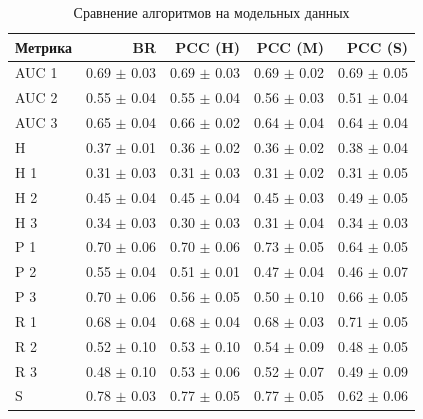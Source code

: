 \documentclass{ITaSconf}
\newcommand\headline{\hline}
\begin{document}
\begin{table}[p]%
	\caption{Сравнение алгоритмов на модельных данных}
	\label{t:modelData}
	\centering\medskip%
	\begin{tabular}{lrrrr}
		\headline
		Метрика &             BR &         PCC (H) &         PCC (M) &         PCC (S) \\
		\headline
		AUC 1 &   0.69 $\pm$ 0.03 &  0.69 $\pm$ 0.03 &  0.69 $\pm$ 0.02 &  0.69 $\pm$ 0.05 \\
		AUC 2 &   0.55 $\pm$ 0.04 &  0.55 $\pm$ 0.04 &  0.56 $\pm$ 0.03 &  0.51 $\pm$ 0.04 \\
		AUC 3 &   0.65 $\pm$ 0.04 &  0.66 $\pm$ 0.02 &  0.64 $\pm$ 0.04 &  0.64 $\pm$ 0.04 \\
		H     &  0.37 $\pm$ 0.01 &  0.36 $\pm$ 0.02 &  0.36 $\pm$ 0.02 &  0.38 $\pm$ 0.04 \\
		H 1   &   0.31 $\pm$ 0.03 &  0.31 $\pm$ 0.03 &  0.31 $\pm$ 0.02 &  0.31 $\pm$ 0.05 \\
		H 2   &   0.45 $\pm$ 0.04 &  0.45 $\pm$ 0.04 &  0.45 $\pm$ 0.03 &  0.49 $\pm$ 0.05 \\
		H 3   &   0.34 $\pm$ 0.03 &   0.30 $\pm$ 0.03 &  0.31 $\pm$ 0.04 &  0.34 $\pm$ 0.03 \\
		P 1   &    0.70 $\pm$ 0.06 &   0.70 $\pm$ 0.06 &  0.73 $\pm$ 0.05 &  0.64 $\pm$ 0.05 \\
		P 2   &   0.55 $\pm$ 0.04 &  0.51 $\pm$ 0.01 &  0.47 $\pm$ 0.04 &  0.46 $\pm$ 0.07 \\
		P 3   &    0.70 $\pm$ 0.06 &  0.56 $\pm$ 0.05 &    0.50 $\pm$ 0.10 &  0.66 $\pm$ 0.05 \\
		R 1   &   0.68 $\pm$ 0.04 &  0.68 $\pm$ 0.04 &  0.68 $\pm$ 0.03 &  0.71 $\pm$ 0.05 \\
		R 2   &    0.52 $\pm$ 0.10 &   0.53 $\pm$ 0.10 &  0.54 $\pm$ 0.09 &  0.48 $\pm$ 0.05 \\
		R 3   &    0.48 $\pm$ 0.10 &  0.53 $\pm$ 0.06 &  0.52 $\pm$ 0.07 &  0.49 $\pm$ 0.09 \\
		S     &   0.78 $\pm$ 0.03 &  0.77 $\pm$ 0.05 &  0.77 $\pm$ 0.05 &  0.62 $\pm$ 0.06 \\
		\headline
	\end{tabular}
\end{table}
\end{document}
